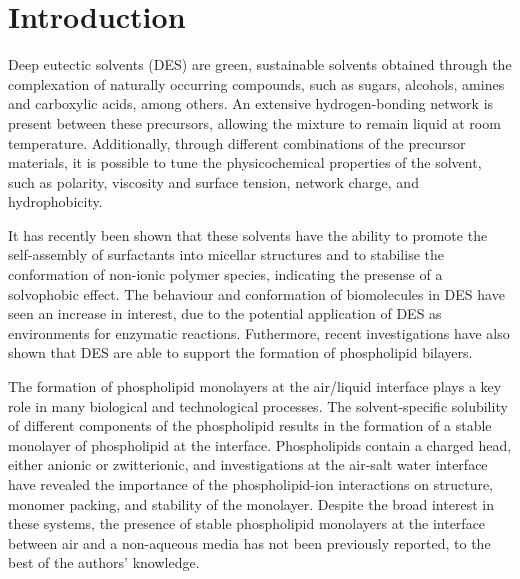 \documentclass[twoside,twocolumn,9pt]{article}
\begin{document}

\section{Introduction}
Deep eutectic solvents (DES) are green, sustainable solvents obtained through the complexation of naturally occurring compounds, such as sugars, alcohols, amines and carboxylic acids, among others.\cite{Smith2014, Dai2013} An extensive hydrogen-bonding network is present between these precursors, allowing the mixture to remain liquid at room temperature.\cite{Hammond2016, Hammond2017, Araujo2017} Additionally, through different combinations of the precursor materials, it is possible to tune the physicochemical properties of the solvent, such as polarity,\cite{Pandey2014} viscosity and surface tension,\cite{Smith2014} network charge,\cite{Zahn2016} and hydrophobicity.\cite{Ribeiro2015,vanOsch2015}

It has recently been shown that these solvents have the ability to promote the self-assembly of surfactants into micellar structures\cite{Sanchez-Fernandez2016,Arnold2015} and to stabilise the conformation of non-ionic polymer species,\cite{Sapir2016} indicating the presense of a solvophobic effect. The behaviour and conformation of biomolecules in DES have seen an increase in interest,\cite{Esquembre2013,Gorke2010,Gorke2008,Monhami2014,Wu2014,Harifi-Mood2017,Milano2017,Sanchez-Fernandez2017} due to the potential application of DES as environments for enzymatic reactions.\cite{Merza2018} Futhermore, recent investigations have also shown that DES are able to support the formation of phospholipid bilayers.\cite{Bryant2017,Bryant2016,Gutierrez2009}

The formation of phospholipid monolayers at the air/liquid interface plays a key role in many biological and technological processes. The solvent-specific solubility of different components of the phospholipid results in the formation of a stable monolayer of phospholipid at the interface.\cite{Mohwald1990} Phospholipids contain a charged head, either anionic or zwitterionic, and investigations at the air-salt water interface have revealed the importance of the phospholipid-ion interactions on structure, monomer packing, and stability of the monolayer.\cite{Mohwald1990,Kewalramani2010} Despite the broad interest in these systems, the presence of stable phospholipid monolayers at the interface between air and a non-aqueous media has not been previously reported, to the best of the authors' knowledge.
\end{document}
